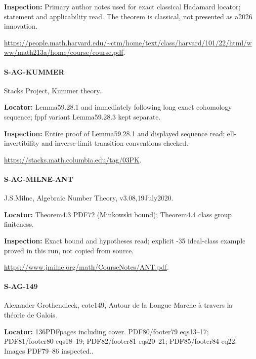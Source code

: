 \documentclass[11pt,a4paper]{article}
\begin{document}
\textbf{Inspection:} Primary author notes used for exact classical Hadamard locator; statement and applicability read.\allowbreak{} The theorem is classical, not presented as a2026 innovation.\allowbreak{}

\url{https://people.math.harvard.edu/~ctm/home/text/class/harvard/101/22/html/www/math213a/home/course/course.pdf}.

\paragraph{S-AG-KUMMER} Stacks Project, Kummer theory.

\textbf{Locator:} Lemma59.\allowbreak{}28.\allowbreak{}1 and immediately following long exact cohomology sequence; fppf variant Lemma59.\allowbreak{}28.\allowbreak{}3 kept separate.

\textbf{Inspection:} Entire proof of Lemma59.\allowbreak{}28.\allowbreak{}1 and displayed sequence read; ell-invertibility and inverse-limit transition conventions checked.\allowbreak{}

\url{https://stacks.math.columbia.edu/tag/03PK}.

\paragraph{S-AG-MILNE-ANT} J.\allowbreak{}S.\allowbreak{}Milne, Algebraic Number Theory, v3.\allowbreak{}08,19July2020.

\textbf{Locator:} Theorem4.\allowbreak{}3 PDF72 (Minkowski bound); Theorem4.\allowbreak{}4 class group finiteness.

\textbf{Inspection:} Exact bound and hypotheses read; explicit -35 ideal-class example proved in this run, not copied from source.\allowbreak{}

\url{https://www.jmilne.org/math/CourseNotes/ANT.pdf}.

\paragraph{S-AG-149} Alexander Grothendieck, cote149, Autour de la Longue Marche à travers la théorie de Galois.

\textbf{Locator:} 136PDFpages including cover.\allowbreak{} PDF80/\allowbreak{}footer79 eqs13–\allowbreak{}17; PDF81/\allowbreak{}footer80 eqs18–\allowbreak{}19; PDF82/\allowbreak{}footer81 eqs20–\allowbreak{}21; PDF85/\allowbreak{}footer84 eq22.\allowbreak{} Images PDF79–\allowbreak{}86 inspected.\allowbreak{}.
\end{document}
